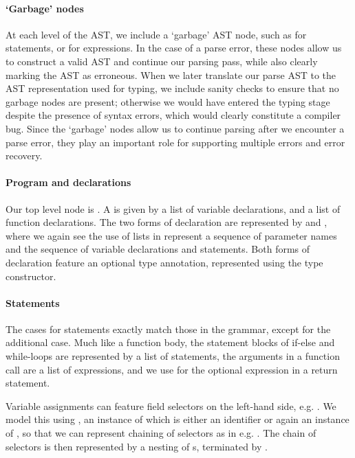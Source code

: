 \paragraph{`Garbage' nodes}
At each level of the AST, we include a `garbage' AST node,
such as  for statements, or  for
expressions. In the case of a parse error, these nodes allow us to construct a
valid AST and continue our parsing pass, while also clearly marking the AST as
erroneous. When we later translate our parse AST to the AST representation used
for typing, we include sanity checks to ensure that no garbage nodes are
present; otherwise we would have entered the typing stage despite the presence
of syntax errors, which would clearly constitute a compiler bug.
Since the `garbage' nodes allow us to continue parsing after we encounter a
parse error, they play an important role for supporting multiple errors
and error recovery.


\paragraph{Program and declarations}
Our top level node is . A  is given by a list
of variable declarations, and a list of function declarations.
The two forms of declaration are represented by  and
, where we again see the use of lists in 
represent a sequence of parameter names and the sequence of variable
declarations and statements.
Both forms of declaration feature an optional type annotation, represented using
the  type constructor.


\paragraph{Statements}
The cases for statements exactly match those in the grammar, except for the
additional  case. Much like a function body, the statement
blocks of if-else and while-loops are represented by a list of statements,
the arguments in a function call are a list of expressions, and we use
 for the optional expression in a return statement.

Variable assignments can feature field selectors on the left-hand side, e.g.
. We model this using , an instance of which
is either an identifier or again an instance of , so that we
can represent chaining of selectors as in e.g. .
The chain of selectors is then represented by a nesting of s,
terminated by .


